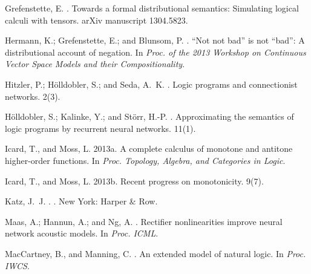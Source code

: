 \documentclass[letterpaper]{article}
\begin{document}
\begin{thebibliography}{}
Grefenstette, E.
.
\newblock Towards a formal distributional semantics: Simulating logical calculi
  with tensors.
\newblock arXiv manuscript 1304.5823.

Hermann, K.; Grefenstette, E.; and Blunsom, P.
.
\newblock ``{N}ot not bad'' is not ``bad'': A distributional account of
  negation.
\newblock In {\em Proc. of the 2013 Workshop on Continuous Vector Space Models
  and their Compositionality}.

Hitzler, P.; H{{\"o}}lldobler, S.; and Seda, A.~K.
.
\newblock Logic programs and connectionist networks.
 2(3).

H{\"o}lldobler, S.; Kalinke, Y.; and St{\"o}rr, H.-P.
.
\newblock Approximating the semantics of logic programs by recurrent neural
  networks.
 11(1).

Icard, T., and Moss, L.
\newblock 2013a.
\newblock A complete calculus of monotone and antitone higher-order functions.
\newblock In {\em Proc. Topology, Algebra, and Categories in Logic}.

Icard, T., and Moss, L.
\newblock 2013b.
\newblock Recent progress on monotonicity.
 9(7).

Katz, J.~J.
.
.
\newblock New York: Harper \& Row.

Maas, A.; Hannun, A.; and Ng, A.
.
\newblock Rectifier nonlinearities improve neural network acoustic models.
\newblock In {\em Proc. ICML}.

MacCartney, B., and Manning, C.
.
\newblock An extended model of natural logic.
\newblock In {\em Proc. IWCS}.


\end{thebibliography}
\end{document}
